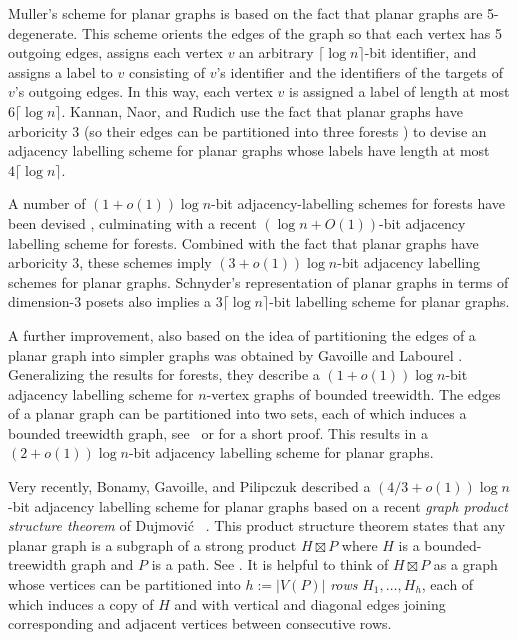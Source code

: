 \documentclass[kpfonts]{patmorin}
\newcommand{\snote}[1]{\fcolorbox{red}{yellow}{#1}}
\begin{document}
Muller's scheme for planar graphs \cite{muller:local} is based on the fact that planar graphs are 5-degenerate.  This scheme orients the edges of the graph so that each vertex has 5 outgoing edges, assigns each vertex $v$ an arbitrary $\lceil\log n\rceil$-bit identifier, and assigns a label to $v$ consisting of $v$'s identifier and the identifiers of the targets of $v$'s outgoing edges.  In this way, each vertex $v$ is assigned a label of length at most $6\lceil\log n\rceil$.  Kannan, Naor, and Rudich \cite{kannan.naor.ea:implicit} use the fact that planar graphs have arboricity 3 (so their edges can be partitioned into three forests \cite{nash-williams:edge-disjoint}) to devise an adjacency labelling scheme for planar graphs whose labels have length at most $4\lceil\log n\rceil$.  

A number of $(1+o(1))\log n$-bit adjacency-labelling schemes for forests have been devised \cite{chung:universal, alstrup.rauhe:improved,alstrup.dahlgaard.ea:optimal}, culminating with a recent $(\log n + O(1))$-bit adjacency labelling scheme \cite{alstrup.dahlgaard.ea:optimal} for forests.  Combined with the fact that planar graphs have arboricity 3, these schemes imply $(3+o(1))\log n$-bit adjacency labelling schemes for planar graphs.  Schnyder's representation of planar graphs in terms of dimension-3 posets \cite{schnyder:planar} also implies a $3\lceil\log n\rceil$-bit labelling scheme for planar graphs. \snote{Piotrek: Really?}

A further improvement, also based on the idea of partitioning the edges of a planar graph into simpler graphs was obtained by Gavoille and Labourel \cite{gavoille.labourel:shorter}.  Generalizing the results for forests, they describe a $(1+o(1))\log n$-bit adjacency labelling scheme for $n$-vertex graphs of bounded treewidth.  The edges of a planar graph can be partitioned into two sets, each of which induces a bounded treewidth graph, see~\cite{DeVos.et.al} or \cite{dujmovic.joret.ea:planar} for a short proof.  This results in a $(2+o(1))\log n$-bit adjacency labelling scheme for planar graphs.

Very recently, Bonamy, Gavoille, and Pilipczuk \cite{bonamy.gavoille.ea:shorter} described a $(4/3+o(1))\log n$-bit adjacency labelling scheme for planar graphs based on a recent \emph{graph product structure theorem} of Dujmović \etal\ \cite{dujmovic.joret.ea:planar}.  This product structure theorem states that any planar graph is a subgraph of a strong product $H\boxtimes P$ where $H$ is a bounded-treewidth graph and $P$ is a path. See . It is helpful to think of $H\boxtimes P$ as a graph whose vertices can be partitioned into $h:=|V(P)|$ \emph{rows} $H_1,\ldots,H_{h}$, each of which induces a copy of $H$ and with vertical and diagonal edges joining corresponding and adjacent vertices between consecutive rows.  
\end{document}
